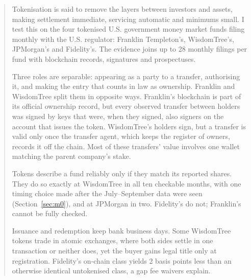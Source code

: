 \documentclass[12pt,a4paper]{article}
\begin{document}
\newpage
\begin{abstract}
\noindent Tokenisation is said to remove the layers between investors and assets, making settlement immediate, servicing automatic and minimums small. I test this on the four tokenised U.S. government money market funds filing monthly with the U.S. regulator: Franklin Templeton's, WisdomTree's, JPMorgan's and Fidelity's. The evidence joins up to 28 monthly filings per fund with blockchain records, signatures and prospectuses.

Three roles are separable: appearing as a party to a transfer, authorising it, and making the entry that counts in law as ownership. Franklin and WisdomTree split them in opposite ways. Franklin's blockchain is part of its official ownership record, but every observed transfer between holders was signed by keys that were, when they signed, also signers on the account that issues the token. WisdomTree's holders sign, but a transfer is valid only once the transfer agent, which keeps the register of owners, records it off the chain. Most of these transfers' value involves one wallet matching the parent company's stake.

Tokens describe a fund reliably only if they match its reported shares. They do so exactly at WisdomTree in all ten checkable months, with one timing choice made after the July--September data were seen (Section~\ref{sec:m0}), and at JPMorgan in two. Fidelity's do not; Franklin's cannot be fully checked.

Issuance and redemption keep bank business days. Some WisdomTree tokens trade in atomic exchanges, where both sides settle in one transaction or neither does, yet the buyer gains legal title only at registration. Fidelity's on-chain class yields 2 basis points less than an otherwise identical untokenised class, a gap fee waivers explain.


\end{abstract}
\end{document}
